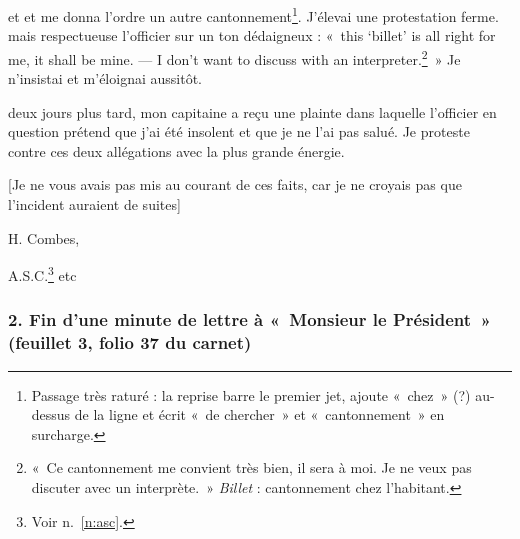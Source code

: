 \begin{LJlettre}
et    et me donna l'ordre       un autre cantonnement\footnote{Passage très raturé : la reprise barre le premier jet, ajoute «~chez~» (?) au-dessus de la ligne et écrit «~de chercher~» et «~cantonnement~» en surcharge.}. \LJdel{\LJill{}} J'élevai  une protestation ferme. mais respectueuse l'officier  sur un ton dédaigneux : «~this `billet' is all right for me, it shall be mine. --- I don't want to discuss with an interpreter.\footnote{«~Ce cantonnement me convient très bien, il sera à moi. Je ne veux pas discuter avec un interprète.~» \textit{Billet} : cantonnement chez l'habitant.}~» Je n'insistai  et m'éloignai aussitôt.

 deux jours plus tard, mon capitaine a reçu une plainte dans laquelle l'officier  en question prétend que j'ai été insolent et que je ne l'ai pas salué. Je proteste contre ces deux allégations avec la plus grande énergie.

[Je ne vous avais pas mis au courant de ces faits, car je ne croyais pas que l'incident auraient de suites]

H. Combes,

A.S.C.\footnote{Voir n.~\ref{n:asc}.} etc
\end{LJlettre}

\subsubsection*{2. Fin d'une minute de lettre à «~Monsieur le Président~» (feuillet 3, folio 37 du carnet)}

